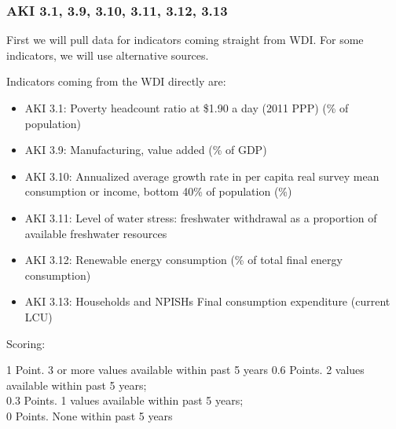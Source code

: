 \documentclass[]{article}
\providecommand{\tightlist}{%
  \setlength{\itemsep}{0pt}\setlength{\parskip}{0pt}}
\begin{document}
\hypertarget{aki-3.1-3.9-3.10-3.11-3.12-3.13}{%
\subsubsection{AKI 3.1, 3.9, 3.10, 3.11, 3.12,
3.13}\label{aki-3.1-3.9-3.10-3.11-3.12-3.13}}

First we will pull data for indicators coming straight from WDI. For
some indicators, we will use alternative sources.

Indicators coming from the WDI directly are:

\begin{itemize}
\tightlist
\item
  AKI 3.1: Poverty headcount ratio at \$1.90 a day (2011 PPP) (\% of
  population)\\
\item
  AKI 3.9: Manufacturing, value added (\% of GDP)\\
\item
  AKI 3.10: Annualized average growth rate in per capita real survey
  mean consumption or income, bottom 40\% of population (\%)\\
\item
  AKI 3.11: Level of water stress: freshwater withdrawal as a proportion
  of available freshwater resources\\
\item
  AKI 3.12: Renewable energy consumption (\% of total final energy
  consumption)\\
\item
  AKI 3.13: Households and NPISHs Final consumption expenditure (current
  LCU)
\end{itemize}

Scoring:

1 Point. 3 or more values available within past 5 years 0.6 Points. 2
values available within past 5 years;\\
0.3 Points. 1 values available within past 5 years;\\
0 Points. None within past 5 years
\end{document}
